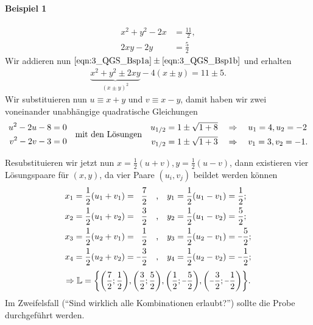 \paragraph{Beispiel 1}
\begin{subequations}
    \begin{align}
        x^2 +y^2 - 2x &= \frac{11}{2}, \label{eqn:3_QGS_Bsp1a}\\
        2xy - 2y &= \frac{5}{2}\label{eqn:3_QGS_Bsp1b}
    \end{align}
\end{subequations}
Wir addieren nun $\eqref{eqn:3_QGS_Bsp1a} \pm \eqref{eqn:3_QGS_Bsp1b}$ und erhalten 
\begin{align}
    \underbrace{x^2 + y^2 \pm 2xy}_{(x\pm y)^2} - 4(x\pm y) = 11 \pm 5.
\end{align}
Wir substituieren nun $u \equiv x+y$ und $v \equiv x-y$, damit haben wir zwei voneinander unabhängige quadratische Gleichungen 
\begin{align}
    \begin{split}
        u^2 - 2u -8 &= 0\\
        v^2 - 2v -3 &= 0
    \end{split} \qq{mit den Lösungen} \begin{split}
        u_{1/2} &= 1 \pm \sqrt{1+8} \quad \Rightarrow \quad u_1 = 4, u_2 = -2 \\
        v_{1/2} &= 1 \pm \sqrt{1+3} \quad \Rightarrow \quad v_1 = 3, v_2 = -1.
    \end{split}
\end{align}

Resubstituieren wir jetzt nun $x = \frac{1}{2}(u+v), y = \frac{1}{2}(u-v)$, dann existieren vier Lösungspaare für $(x,y)$, da vier Paare $(u_i, v_j)$ beildet werden können 
\begin{align}
    \begin{split}
        x_1 &= \frac{1}{2}(u_1+v_1) = \hphantom{\minus}\frac{7}{2} \qq{,} y_1 = \frac{1}{2}(u_1-v_1) = \frac{1}{2};\\
        x_2 &= \frac{1}{2}(u_1+v_2) = \hphantom{\minus}\frac{3}{2} \qq{,} y_2 = \frac{1}{2}(u_1-v_2) = \frac{5}{2};\\
        x_3 &= \frac{1}{2}(u_2+v_1) = \hphantom{\minus}\frac{1}{2} \qq{,} y_3 = \frac{1}{2}(u_2-v_1) = \minus\frac{5}{2};\\
        x_4 &= \frac{1}{2}(u_2+v_2) = \minus\frac{3}{2}             \qq{,} y_4 = \frac{1}{2}(u_2-v_2) = \minus\frac{1}{2};
    \end{split}
\end{align}
\begin{align}
    \Rightarrow \mathbb{L} = \bigg\{\qty(\frac{7}{2};\frac{1}{2}),\qty(\frac{3}{2};\frac{5}{2}),\qty(\frac{1}{2};\minus\frac{5}{2}),\qty(\minus\frac{3}{2};\minus\frac{1}{2})\bigg\}.
\end{align}
Im Zweifelsfall (``Sind wirklich alle Kombinationen erlaubt?'') sollte die Probe durchgeführt werden. 

